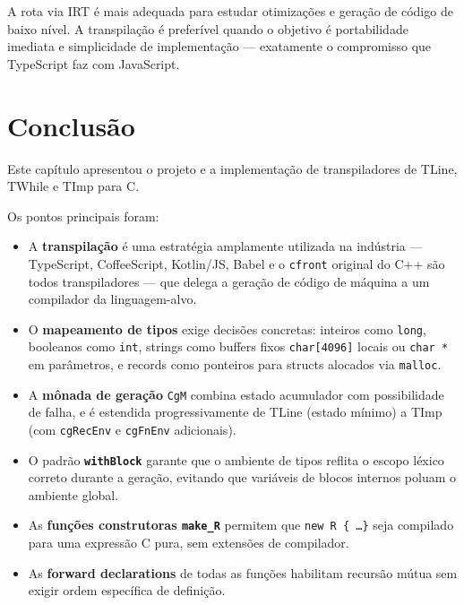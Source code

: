 A rota via IRT é mais adequada para estudar otimizações e geração de código
de baixo nível.  A transpilação é preferível quando o objetivo é portabilidade
imediata e simplicidade de implementação — exatamente o compromisso que
TypeScript faz com JavaScript.

\section{Conclusão}\label{sec:transp-conclusao}

Este capítulo apresentou o projeto e a implementação de transpiladores de
TLine, TWhile e TImp para C.

Os pontos principais foram:

\begin{itemize}
  \item A \textbf{transpilação} é uma estratégia amplamente utilizada na
    indústria — TypeScript, CoffeeScript, Kotlin/JS, Babel e o \texttt{cfront}
    original do C++ são todos transpiladores — que delega a geração de código
    de máquina a um compilador da linguagem-alvo.

  \item O \textbf{mapeamento de tipos} exige decisões concretas: inteiros como
    \texttt{long}, booleanos como \texttt{int}, strings como buffers fixos
    \texttt{char[4096]} locais ou \texttt{char *} em parâmetros, e records como
    ponteiros para structs alocados via \texttt{malloc}.

  \item A \textbf{mônada de geração} \texttt{CgM} combina estado acumulador
    com possibilidade de falha, e é estendida progressivamente de TLine (estado
    mínimo) a TImp (com \texttt{cgRecEnv} e \texttt{cgFnEnv} adicionais).

  \item O padrão \textbf{\texttt{withBlock}} garante que o ambiente de tipos
    reflita o escopo léxico correto durante a geração, evitando que variáveis
    de blocos internos poluam o ambiente global.

  \item As \textbf{funções construtoras \texttt{make\_R}} permitem que
    \texttt{new R \{ \ldots \}} seja compilado para uma expressão C pura,
    sem extensões de compilador.

  \item As \textbf{forward declarations} de todas as funções habilitam
    recursão mútua sem exigir ordem específica de definição.
\end{itemize}

